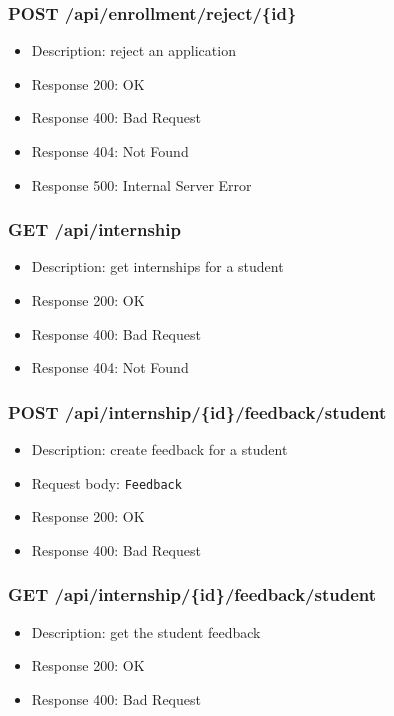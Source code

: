 \subsubsection{POST /api/enrollment/reject/\{id\}}
\begin{itemize}
    \item Description: reject an application
    \item Response 200: OK
    \item Response 400: Bad Request
    \item Response 404: Not Found
    \item Response 500: Internal Server Error
\end{itemize}

\subsubsection{GET /api/internship}
\begin{itemize}
    \item Description: get internships for a student
    \item Response 200: OK
    \item Response 400: Bad Request
    \item Response 404: Not Found
\end{itemize}

\subsubsection{POST /api/internship/\{id\}/feedback/student}
\begin{itemize}
    \item Description: create feedback for a student
    \item Request body: \verb|Feedback|
    \item Response 200: OK
    \item Response 400: Bad Request
\end{itemize}

\subsubsection{GET /api/internship/\{id\}/feedback/student}
\begin{itemize}
    \item Description: get the student feedback
    \item Response 200: OK
    \item Response 400: Bad Request
\end{itemize}

